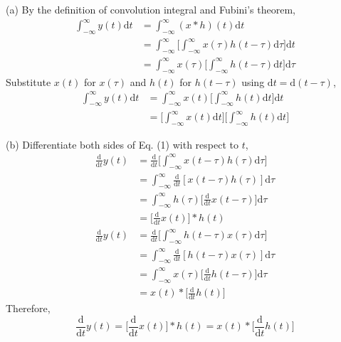 \documentclass[a4paper]{article}
\begin{document}
(a)
By the definition of convolution integral and Fubini's theorem,
\begin{align*}
    \int_{-\infty}^\infty y(t)\mathrm{d}t&=\int_{-\infty}^\infty(x*h)(t)\mathrm{d}t\\
    &=\int_{-\infty}^\infty\bigg[\int_{-\infty}^\infty x(\tau)h(t-\tau)\mathrm{d}\tau\bigg]\mathrm{d}t\\
    &=\int_{-\infty}^\infty x(\tau)\bigg[\int_{-\infty}^\infty h(t-\tau)\mathrm{d}t\bigg]\mathrm{d}\tau
\end{align*}
Substitute $x(t)$ for $x(\tau)$ and $h(t)$ for $h(t-\tau)$ using $\mathrm{d}t=\mathrm{d}(t-\tau)$,
\begin{align*}
    \int_{-\infty}^\infty y(t)\mathrm{d}t&=\int_{-\infty}^\infty x(t)\bigg[\int_{-\infty}^\infty h(t)\mathrm{d}t\bigg]\mathrm{d}t\\
    &=\bigg[\int_{-\infty}^\infty x(t)\mathrm{d}t\bigg]\bigg[\int_{-\infty}^\infty h(t)\mathrm{d}t\bigg]
\end{align*}

(b) Differentiate both sides of Eq. (1) with respect to $t$,
\begin{align*}
    \frac{\mathrm{d}}{\mathrm{d}t}y(t)&=\frac{\mathrm{d}}{\mathrm{d}t}\bigg[\int_{-\infty}^\infty x(t-\tau)h(\tau)\mathrm{d}\tau\bigg]\\
    &=\int_{-\infty}^\infty\frac{\mathrm{d}}{\mathrm{d}t}[x(t-\tau)h(\tau)]\mathrm{d}\tau\\
    &=\int_{-\infty}^\infty h(\tau)\bigg[\frac{\mathrm{d}}{\mathrm{d}t}x(t-\tau)\bigg]\mathrm{d}\tau\\
    &=\bigg[\frac{\mathrm{d}}{\mathrm{d}t}x(t)\bigg]*h(t)
\end{align*}
\begin{align*}
    \frac{\mathrm{d}}{\mathrm{d}t}y(t)&=\frac{\mathrm{d}}{\mathrm{d}t}\bigg[\int_{-\infty}^\infty h(t-\tau)x(\tau)\mathrm{d}\tau\bigg]\\
    &=\int_{-\infty}^\infty\frac{\mathrm{d}}{\mathrm{d}t}[h(t-\tau)x(\tau)]\mathrm{d}\tau\\
    &=\int_{-\infty}^\infty x(\tau)\bigg[\frac{\mathrm{d}}{\mathrm{d}t}h(t-\tau)\bigg]\mathrm{d}\tau\\
    &=x(t)*\bigg[\frac{\mathrm{d}}{\mathrm{d}t}h(t)\bigg]
\end{align*}
Therefore,
\begin{equation}
    \frac{\mathrm{d}}{\mathrm{d}t}y(t)=\bigg[\frac{\mathrm{d}}{\mathrm{d}t}x(t)\bigg]*h(t)=x(t)*\bigg[\frac{\mathrm{d}}{\mathrm{d}t}h(t)\bigg]    
\end{equation}
\end{document}
